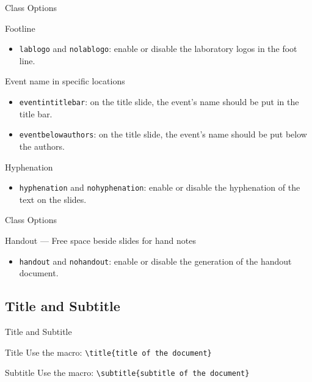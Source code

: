 \documentclass[english,sectioncirclenumberstyle]{ciadbeamer}
\begin{document}
\begin{frame}[t]{Class Options \insertcontinuationtext}
	\begin{block}{Footline}
		\begin{itemize}
		\item \texttt{lablogo} and \texttt{nolablogo}: enable or disable the laboratory logos in the foot line.
		\end{itemize}
	\end{block}
	\begin{block}{Event name in specific locations}
		\begin{itemize}
		\item \texttt{eventintitlebar}: on the title slide, the event's name should be put in the title bar.
		\item \texttt{eventbelowauthors}: on the title slide, the event's name should be put below the authors.
		\end{itemize}
	\end{block}
	\begin{block}{Hyphenation}
		\begin{itemize}
		\item \texttt{hyphenation} and \texttt{nohyphenation}: enable or disable the hyphenation of the text on the slides.
		\end{itemize}
	\end{block}
\end{frame}

\begin{frame}[t]{Class Options \insertcontinuationtext}
	\begin{block}{Handout --- Free space beside slides for hand notes}
		\begin{itemize}
		\item \texttt{handout} and \texttt{nohandout}: enable or disable the generation of the handout document.
		\end{itemize}
	\end{block}
\end{frame}

\subsection{Title and Subtitle}

\begin{frame}{Title and Subtitle}
	\begin{block}{Title}
		Use the macro: \texttt{{\textbackslash}title\{title of the document\}}
	\end{block}
	\vfill
	\begin{block}{Subtitle}
		Use the macro: \texttt{{\textbackslash}subtitle\{subtitle of the document\}}
	\end{block}
	\vfill
\end{frame}
\end{document}
